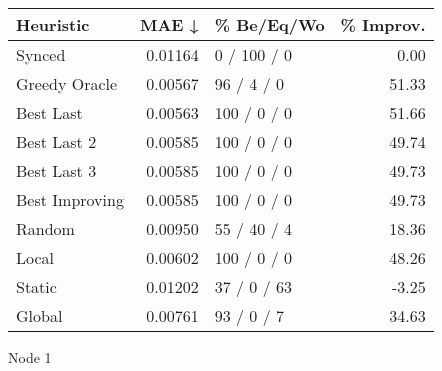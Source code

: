 \begin{tabular}{lrlr}
\toprule
\textbf{Heuristic} & \textbf{MAE ↓} & \textbf{\% Be/Eq/Wo} & \textbf{\% Improv.} \\
\midrule
            Synced &        0.01164 &          0 / 100 / 0 &                0.00 \\
     Greedy Oracle &        0.00567 &           96 / 4 / 0 &               51.33 \\
         Best Last &        0.00563 &          100 / 0 / 0 &               51.66 \\
       Best Last 2 &        0.00585 &          100 / 0 / 0 &               49.74 \\
       Best Last 3 &        0.00585 &          100 / 0 / 0 &               49.73 \\
    Best Improving &        0.00585 &          100 / 0 / 0 &               49.73 \\
            Random &        0.00950 &          55 / 40 / 4 &               18.36 \\
             Local &        0.00602 &          100 / 0 / 0 &               48.26 \\
            Static &        0.01202 &          37 / 0 / 63 &               -3.25 \\
            Global &        0.00761 &           93 / 0 / 7 &               34.63 \\
\bottomrule
\end{tabular}
\caption{Node 1}
\label{tab:non_lr01_le1_bs4_1}
